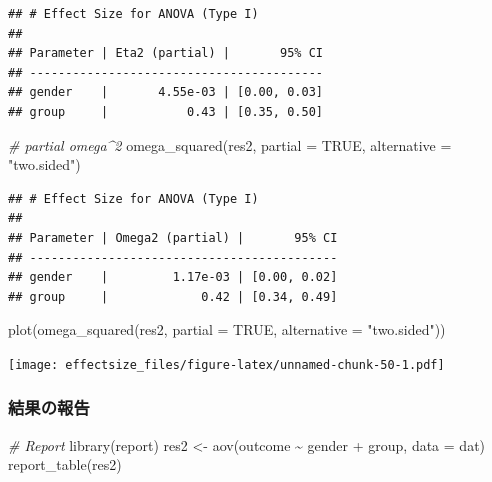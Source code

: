 \documentclass[
  ja=standard, xelatex, base=12pt]{bxjsreport}
\newenvironment{Shaded}{\begin{snugshade}}{\end{snugshade}}
\newcommand{\AttributeTok}[1]{\textcolor[rgb]{0.77,0.63,0.00}{#1}}
\newcommand{\CommentTok}[1]{\textcolor[rgb]{0.56,0.35,0.01}{\textit{#1}}}
\newcommand{\ConstantTok}[1]{\textcolor[rgb]{0.00,0.00,0.00}{#1}}
\newcommand{\FunctionTok}[1]{\textcolor[rgb]{0.00,0.00,0.00}{#1}}
\newcommand{\NormalTok}[1]{#1}
\newcommand{\OtherTok}[1]{\textcolor[rgb]{0.56,0.35,0.01}{#1}}
\newcommand{\SpecialCharTok}[1]{\textcolor[rgb]{0.00,0.00,0.00}{#1}}
\newcommand{\StringTok}[1]{\textcolor[rgb]{0.31,0.60,0.02}{#1}}
\begin{document}
\begin{verbatim}
## # Effect Size for ANOVA (Type I)
## 
## Parameter | Eta2 (partial) |       95% CI
## -----------------------------------------
## gender    |       4.55e-03 | [0.00, 0.03]
## group     |           0.43 | [0.35, 0.50]
\end{verbatim}

\begin{Shaded}
\begin{Highlighting}[]
\CommentTok{\# partial omega\^{}2}
\FunctionTok{omega\_squared}\NormalTok{(res2, }\AttributeTok{partial =} \ConstantTok{TRUE}\NormalTok{, }\AttributeTok{alternative =} \StringTok{"two.sided"}\NormalTok{)}
\end{Highlighting}
\end{Shaded}

\begin{verbatim}
## # Effect Size for ANOVA (Type I)
## 
## Parameter | Omega2 (partial) |       95% CI
## -------------------------------------------
## gender    |         1.17e-03 | [0.00, 0.02]
## group     |             0.42 | [0.34, 0.49]
\end{verbatim}

\begin{Shaded}
\begin{Highlighting}[]
\FunctionTok{plot}\NormalTok{(}\FunctionTok{omega\_squared}\NormalTok{(res2, }\AttributeTok{partial =} \ConstantTok{TRUE}\NormalTok{, }\AttributeTok{alternative =} \StringTok{"two.sided"}\NormalTok{))}
\end{Highlighting}
\end{Shaded}

\texttt{[image: effectsize\_files/figure-latex/unnamed-chunk-50-1.pdf]}

\hypertarget{ux7d50ux679cux306eux5831ux544a-3}{%
\subsubsection{結果の報告}\label{ux7d50ux679cux306eux5831ux544a-3}}

\begin{Shaded}
\begin{Highlighting}[]
\CommentTok{\# Report}
\FunctionTok{library}\NormalTok{(report)}
\NormalTok{res2 }\OtherTok{\textless{}{-}} \FunctionTok{aov}\NormalTok{(outcome }\SpecialCharTok{\textasciitilde{}}\NormalTok{ gender }\SpecialCharTok{+}\NormalTok{ group, }\AttributeTok{data =}\NormalTok{ dat)}
\FunctionTok{report\_table}\NormalTok{(res2)}
\end{Highlighting}
\end{Shaded}
\end{document}
